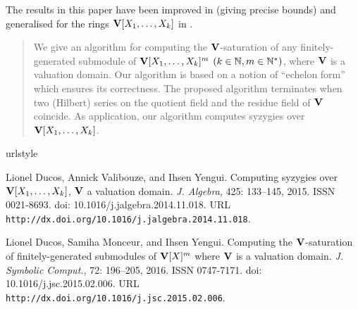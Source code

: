 \documentclass[11pt,a4paper,twoside]{article}
\begin{document}
\bigskip The results in this paper have been improved in \citealt*{DMY2016} 
(giving precise bounds) and generalised
for the rings $\bold V[X_1,\dots,X_k]$ in \citealt*{DVY2015}.
\begin{abstract} 
We give an algorithm for computing the $\bold V$-saturation of any finitely-generated submodule of $\bold V[X_1,\dots,X_k]^m$ $(k\in \mathbb{N}, m \in \mathbb{N}^*)$, where $\bold V$ is a valuation domain. Our algorithm is based on a notion of “echelon form” which ensures its correctness. The proposed algorithm terminates when two (Hilbert) series on the quotient field and the residue field of $\bold V$ coincide. As application, our algorithm computes syzygies over $\bold V[X_1,\dots,X_k]$.


\end{abstract}



{\small 

%
%
%

\begin{thebibliography}{2}
\providecommand{\natexlab}[1]{#1}
\providecommand{\url}[1]{\texttt{#1}}
\expandafter\ifx\csname urlstyle\endcsname\relax
  \providecommand{\doi}[1]{doi: #1}\else
  \providecommand{\doi}{doi: \begingroup \urlstyle{rm}\Url}\fi

Lionel Ducos, Annick Valibouze, and Ihsen Yengui.
\newblock Computing syzygies over {$\bold V[X_1,\dots,X_k]$}, {$\bold V$} a
  valuation domain.
\newblock \emph{J. Algebra}, 425: 133--145, 2015.
\newblock ISSN 0021-8693.
\newblock \doi{10.1016/j.jalgebra.2014.11.018}.
\newblock URL \url{http://dx.doi.org/10.1016/j.jalgebra.2014.11.018}.

Lionel Ducos, Samiha Monceur, and Ihsen Yengui.
\newblock Computing the {$\bold{V}$}-saturation of finitely-generated
  submodules of {$\bold{V}[X]^m$} where {$\bold{V}$} is a valuation domain.
\newblock \emph{J. Symbolic Comput.}, 72: 196--205, 2016.
\newblock ISSN 0747-7171.
\newblock \doi{10.1016/j.jsc.2015.02.006}.
\newblock URL \url{http://dx.doi.org/10.1016/j.jsc.2015.02.006}.

\end{thebibliography}


}
\end{document}
